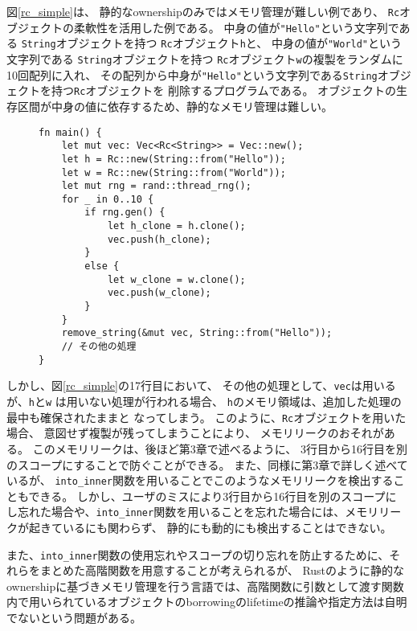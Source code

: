 \documentclass{sumiilab-paper}
\theoremstyle{mystyle}
\numberwithin{definition}{chapter} %
\begin{document}
図\ref{rc_simple}は、
静的なownershipのみではメモリ管理が難しい例であり、
\texttt{Rc}オブジェクトの柔軟性を活用した例である。
中身の値が\texttt{"Hello"}という文字列である
\texttt{String}オブジェクトを持つ
\texttt{Rc}オブジェクト\texttt{h}と、
中身の値が\texttt{"World"}という文字列である
\texttt{String}オブジェクトを持つ
\texttt{Rc}オブジェクト\texttt{w}の複製をランダムに10回配列に入れ、
その配列から中身が\texttt{"Hello"}という文字列である\texttt{String}オブジェクトを持つ\texttt{Rc}オブジェクトを
削除するプログラムである。
オブジェクトの生存区間が中身の値に依存するため、静的なメモリ管理は難しい。
\begin{figure}[htp]
\begin{lstlisting}[caption=静的なメモリ管理では柔軟性に欠ける例, label=rc_simple, captionpos=b]
fn main() {
    let mut vec: Vec<Rc<String>> = Vec::new();
    let h = Rc::new(String::from("Hello"));
    let w = Rc::new(String::from("World"));
    let mut rng = rand::thread_rng();
    for _ in 0..10 {
        if rng.gen() {
            let h_clone = h.clone();
            vec.push(h_clone);
        }
        else {
            let w_clone = w.clone();
            vec.push(w_clone);
        }
    }
    remove_string(&mut vec, String::from("Hello"));
    // その他の処理
}
\end{lstlisting}
\end{figure}

しかし、図\ref{rc_simple}の17行目において、
その他の処理として、\texttt{vec}は用いるが、\texttt{h}と\texttt{w}
は用いない処理が行われる場合、
\texttt{h}のメモリ領域は、追加した処理の最中も確保されたままと
なってしまう。
このように、\texttt{Rc}オブジェクトを用いた場合、
意図せず複製が残ってしまうことにより、
メモリリークのおそれがある。
このメモリリークは、後ほど第3章で述べるように、
3行目から16行目を別のスコープにすることで防ぐことができる。
また、同様に第3章で詳しく述べているが、
\texttt{into\_inner}関数を用いることでこのようなメモリリークを検出することもできる。
しかし、ユーザのミスにより3行目から16行目を別のスコープに
し忘れた場合や、\texttt{into\_inner}関数を用いることを忘れた場合には、メモリリークが起きているにも関わらず、
静的にも動的にも検出することはできない。

また、\texttt{into\_inner}関数の使用忘れやスコープの切り忘れを防止するために、それらをまとめた高階関数を用意することが考えられるが、
Rustのように静的なownershipに基づきメモリ管理を行う言語では、高階関数に引数として渡す関数内で用いられているオブジェクトのborrowingのlifetimeの推論や指定方法は自明でないという問題がある。
\end{document}
